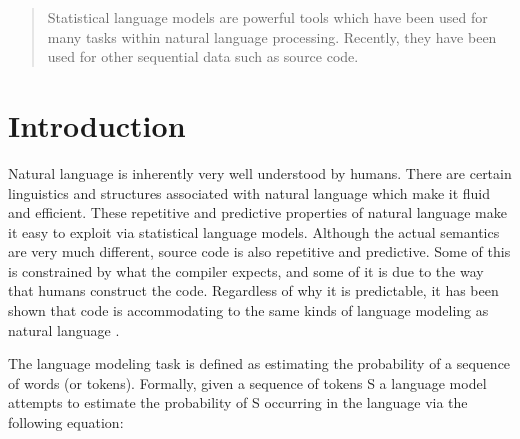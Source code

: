 \documentclass{article}
\begin{document}
 


\begin{abstract} 
Statistical language models are powerful tools which have been used for many tasks within natural language processing.
Recently, they have been used for other sequential data such as source code. \cite{ray2015naturalness} 
\end{abstract} 

\section{Introduction}
\label{introduction}
Natural language is inherently very well understood by humans. There are certain linguistics and structures associated with natural language which make it fluid and efficient. These repetitive and predictive properties of natural language make it easy to exploit via statistical language models. Although the actual semantics are very much different, source code is also repetitive and predictive. Some of this is constrained by what the compiler expects, and some of it is due to the way that humans construct the code. Regardless of why it is predictable, it has been shown that code is accommodating to the same kinds of language modeling as natural language  \citep{hindle2012naturalness}. 

The language modeling task is defined as estimating the probability of a sequence of words (or tokens). Formally,
given a sequence of tokens S a language model attempts to estimate the probability of S occurring in the language via the following equation:
\end{document}
